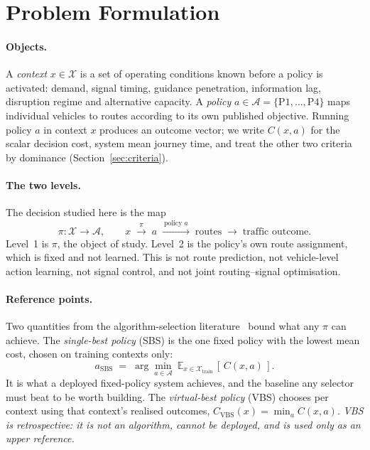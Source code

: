 \documentclass[runningheads]{llncs}
\begin{document}
\section{Problem Formulation}

\paragraph{Objects.}
A \emph{context} $x \in \mathcal{X}$ is a set of operating conditions known
before a policy is activated: demand, signal timing, guidance penetration,
information lag, disruption regime and alternative capacity. A \emph{policy}
$a \in \mathcal{A} = \{\mathrm{P1},\dots,\mathrm{P4}\}$ maps individual vehicles
to routes according to its own published objective. Running policy $a$ in
context $x$ produces an outcome vector; we write $C(x,a)$ for the scalar
decision cost, system mean journey time, and treat the other two criteria by
dominance (Section~\ref{sec:criteria}).

\paragraph{The two levels.}
The decision studied here is the map
\begin{equation}
\pi : \mathcal{X} \to \mathcal{A},
\qquad
x \;\xrightarrow{\ \pi\ }\; a \;\xrightarrow{\ \text{policy } a\ }\;
\text{routes} \;\longrightarrow\; \text{traffic outcome}.
\end{equation}
Level~1 is $\pi$, the object of study. Level~2 is the policy's own route
assignment, which is fixed and not learned. This is not route prediction, not
vehicle-level action learning, not signal control, and not joint
routing--signal optimisation.

\paragraph{Reference points.}
Two quantities from the algorithm-selection literature~\cite{bischl2016aslib}
bound what any $\pi$ can achieve. The \emph{single-best policy} (SBS) is the one
fixed policy with the lowest mean cost, chosen on training contexts only:
\begin{equation}
a_{\mathrm{SBS}} \;=\; \arg\min_{a \in \mathcal{A}}\
\mathbb{E}_{x \in \mathcal{X}_{\mathrm{train}}}\,[\,C(x,a)\,].
\end{equation}
It is what a deployed fixed-policy system achieves, and the baseline any
selector must beat to be worth building. The \emph{virtual-best policy} (VBS)
chooses per context using that context's realised outcomes,
$C_{\mathrm{VBS}}(x) = \min_{a} C(x,a)$. \emph{VBS is retrospective: it is not
an algorithm, cannot be deployed, and is used only as an upper reference.}
\end{document}
